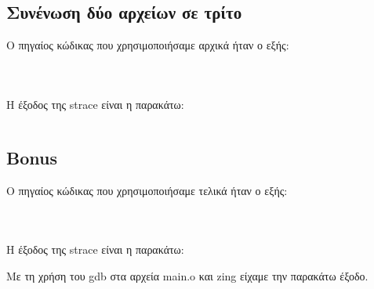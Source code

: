 \documentclass[a4paper,10pt]{article} \usepackage{anysize}
\begin{document}
\pagebreak

\subsection{Συνένωση δύο αρχείων σε τρίτο}

Ο πηγαίος κώδικας που χρησιμοποιήσαμε αρχικά ήταν ο εξής:
\inputminted[linenos,fontsize=\footnotesize]{c}{../stage_1/fconc.h}

\inputminted[linenos,fontsize=\footnotesize]{c}{../stage_1/fconc.c}

\inputminted[linenos,fontsize=\footnotesize]{basemake}{../stage_1/makefile}


Η έξοδος της strace είναι η παρακάτω:

\inputminted[linenos,obeytabs,fontsize=\footnotesize]{text}{../stage_1/strace_outfile}

\subsection{Bonus}
Ο πηγαίος κώδικας που χρησιμοποιήσαμε τελικά ήταν ο εξής:
\inputminted[linenos,fontsize=\footnotesize]{c}{../stage_2/fconc.h}
\inputminted[linenos,fontsize=\footnotesize]{c}{../stage_2/fconc.c}
\inputminted[linenos,fontsize=\footnotesize]{basemake}{../stage_2/makefile}
Η έξοδος της strace είναι η παρακάτω:

Με τη χρήση του gdb στα αρχεία main.o και zing είχαμε την παρακάτω έξοδο.


\end{document}
